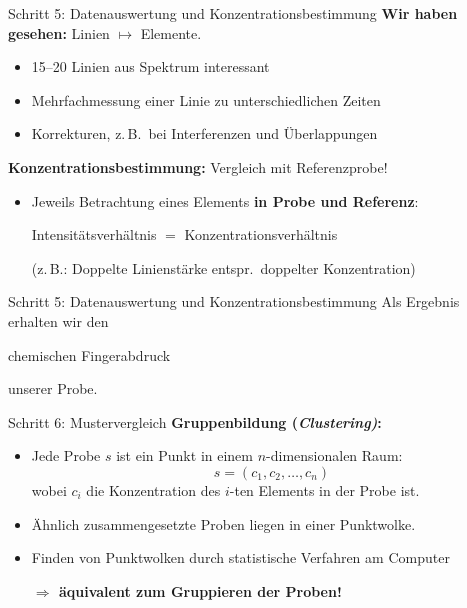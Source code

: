 \documentclass[xcolor=dvipsnames, aspectratio=169]{beamer}
\begin{document}
\begin{frame}{Schritt 5: Datenauswertung und Konzentrationsbestimmung}
\textbf{Wir haben gesehen:} Linien $\mapsto$ Elemente.
\begin{itemize}
\item 15--20 Linien aus Spektrum interessant
\item Mehrfachmessung einer Linie zu unterschiedlichen Zeiten
\item Korrekturen, z.\,B.\ bei Interferenzen und Überlappungen
\end{itemize}\medskip\pause

\textbf{Konzentrationsbestimmung:} Vergleich mit Referenzprobe!
\begin{itemize}
\item Jeweils Betrachtung eines Elements \textbf{in Probe und Referenz}:

\begin{center}
\alert{Intensitätsverhältnis $=$ Konzentrationsverhältnis}
\end{center}

(z.\,B.: Doppelte Linienstärke entspr.\ doppelter Konzentration)
\end{itemize}
\end{frame}

\begin{frame}{Schritt 5: Datenauswertung und Konzentrationsbestimmung}
\vspace*{-1em}
\Large Als Ergebnis erhalten wir den
\begin{huge}
\begin{center}
chemischen Fingerabdruck
\end{center}
\end{huge}
unserer Probe.
\end{frame}

\begin{frame}{Schritt 6: Mustervergleich}
\textbf{Gruppenbildung (\textit{Clustering)}:}
\begin{itemize}
\item Jede Probe $s$ ist ein \alert{Punkt} in einem $n$-dimensionalen Raum: \[s=(c_1,c_2,\dots,c_n)\] wobei $c_i$ die Konzentration des $i$-ten Elements in der Probe ist.
\item Ähnlich zusammengesetzte Proben liegen in einer \alert{Punktwolke}.
\item Finden von Punktwolken durch statistische Verfahren am Computer

\textbf{$\Rightarrow$ äquivalent zum Gruppieren der Proben!}
\end{itemize}
\end{frame}
\end{document}
